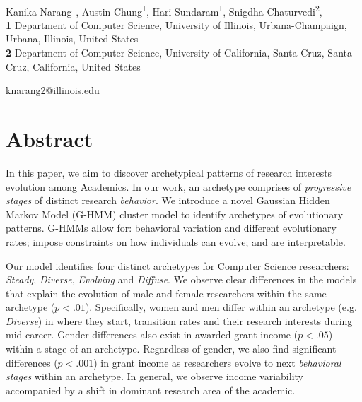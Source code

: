 \documentclass[10pt,letterpaper]{article}
\begin{document}
\vspace*{0.2in}

\begin{flushleft}
{\Large
\textbf{} %
}
\newline
\\
Kanika Narang\textsuperscript{1},
Austin Chung\textsuperscript{1},
Hari Sundaram\textsuperscript{1},
Snigdha Chaturvedi\textsuperscript{2},
\\
\bigskip
\textbf{1} Department of Computer Science, University of Illinois, Urbana-Champaign, Urbana, Illinois, United States
\\
\textbf{2} Department of Computer Science, University of California, Santa Cruz, Santa Cruz, California, United States
\\
\bigskip


knarang2@illinois.edu

\end{flushleft}
\section*{Abstract}
In this paper, we aim to discover archetypical patterns of research interests evolution among Academics. In our work, an archetype comprises of \emph{progressive stages} of distinct research \emph{behavior}. We introduce a novel Gaussian Hidden Markov Model (G-HMM) cluster model to identify archetypes of evolutionary patterns. G-HMMs allow for: behavioral variation and different evolutionary rates; impose constraints on how individuals can evolve; and are interpretable.

Our model identifies four distinct archetypes for Computer Science researchers: \emph{Steady}, \emph{Diverse}, \emph{Evolving} and \emph{Diffuse}. We observe clear differences in the models that explain the evolution of male and female researchers within the same archetype ($p < .01$). Specifically, women and men differ within an archetype (e.g. \emph{Diverse}) in where they start, transition rates and their research interests during mid-career. Gender differences also exist in awarded grant income ($p < .05$) within a stage of an archetype. Regardless of gender, we also find significant differences ($p < .001$) in grant income as researchers evolve to next \emph{behavioral stages} within an archetype. In general, we observe income variability accompanied by a shift in dominant research area of the academic.
\end{document}

